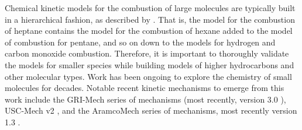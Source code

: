 \documentclass[12pt, letterpaper]{article}
\begin{document}
Chemical kinetic models for the combustion of large molecules are typically 
built in a hierarchical fashion, as described by \textcite{Westbrook1984}. That 
is, the model for the combustion of heptane contains the model for the 
combustion of hexane added to the model of combustion for pentane, and so on 
down to the models for hydrogen and carbon monoxide combustion. Therefore, it 
is important to thoroughly validate the models for smaller species while 
building models of higher hydrocarbons and other molecular types. Work has been 
ongoing to explore the chemistry of small molecules for decades. Notable recent 
kinetic mechanisms to emerge from this work include the GRI-Mech series of 
mechanisms (most recently, version 3.0 \cite{Smith}), USC-Mech v2 
\cite{Wang2007}, and the AramcoMech series of mechanisms, most recently version 
1.3 \cite{Metcalfe2013}.
\end{document}
